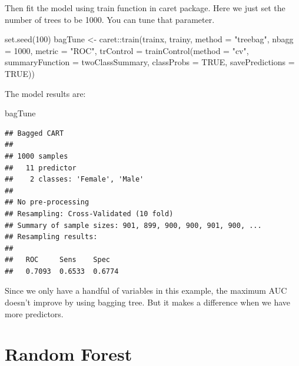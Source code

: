 \documentclass[
  12pt,
]{krantz}
\makeatletter
\newenvironment{Shaded}{\begin{snugshade}}{\end{snugshade}}
\newcommand{\AttributeTok}[1]{\textcolor[rgb]{0.61,0.61,0.61}{#1}}
\newcommand{\ConstantTok}[1]{\textcolor[rgb]{0,0,0}{#1}}
\newcommand{\DecValTok}[1]{\textcolor[rgb]{0.06,0.06,0.06}{#1}}
\newcommand{\FunctionTok}[1]{\textcolor[rgb]{0,0,0}{#1}}
\newcommand{\NormalTok}[1]{#1}
\newcommand{\OtherTok}[1]{\textcolor[rgb]{0.37,0.37,0.37}{#1}}
\newcommand{\SpecialCharTok}[1]{\textcolor[rgb]{0,0,0}{#1}}
\newcommand{\StringTok}[1]{\textcolor[rgb]{0.5,0.5,0.5}{#1}}
\newenvironment{kframe}{%
\medskip{}
\setlength{\fboxsep}{.8em}
 \def\at@end@of@kframe{}%
 \ifinner\ifhmode%
  \def\at@end@of@kframe{\end{minipage}}%
  \begin{minipage}{\columnwidth}%
 \fi\fi%
 \def\FrameCommand##1{\hskip\@totalleftmargin \hskip-\fboxsep
 \colorbox{shadecolor}{##1}\hskip-\fboxsep
     \hskip-\linewidth \hskip-\@totalleftmargin \hskip\columnwidth}%
 \MakeFramed {\advance\hsize-\width
   \@totalleftmargin\z@ \linewidth\hsize
   \@setminipage}}%
 {\par\unskip\endMakeFramed%
 \at@end@of@kframe}
\renewenvironment{Shaded}{\begin{kframe}}{\end{kframe}}
\makeatother
\begin{document}
Then fit the model using train function in caret package. Here we just set the number of trees to be 1000. You can tune that parameter.

\begin{Shaded}
\begin{Highlighting}[]
\FunctionTok{set.seed}\NormalTok{(}\DecValTok{100}\NormalTok{)}
\NormalTok{bagTune }\OtherTok{\textless{}{-}}\NormalTok{ caret}\SpecialCharTok{::}\FunctionTok{train}\NormalTok{(trainx, trainy, }
                           \AttributeTok{method =} \StringTok{"treebag"}\NormalTok{,}
                           \AttributeTok{nbagg =} \DecValTok{1000}\NormalTok{,}
                           \AttributeTok{metric =} \StringTok{"ROC"}\NormalTok{,}
                           \AttributeTok{trControl =} \FunctionTok{trainControl}\NormalTok{(}\AttributeTok{method =} \StringTok{"cv"}\NormalTok{,}
                           \AttributeTok{summaryFunction =}\NormalTok{ twoClassSummary,}
                           \AttributeTok{classProbs =} \ConstantTok{TRUE}\NormalTok{,}
                           \AttributeTok{savePredictions =} \ConstantTok{TRUE}\NormalTok{))}
\end{Highlighting}
\end{Shaded}

The model results are:

\begin{Shaded}
\begin{Highlighting}[]
\NormalTok{bagTune}
\end{Highlighting}
\end{Shaded}

\begin{verbatim}
## Bagged CART 
## 
## 1000 samples
##   11 predictor
##    2 classes: 'Female', 'Male' 
## 
## No pre-processing
## Resampling: Cross-Validated (10 fold) 
## Summary of sample sizes: 901, 899, 900, 900, 901, 900, ... 
## Resampling results:
## 
##   ROC     Sens    Spec  
##   0.7093  0.6533  0.6774
\end{verbatim}

Since we only have a handful of variables in this example, the maximum AUC doesn't improve by using bagging tree. But it makes a difference when we have more predictors.

\hypertarget{random-forest}{%
\section{Random Forest}\label{random-forest}}
\end{document}
